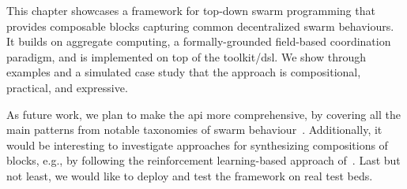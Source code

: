 This chapter showcases
 a framework 
 for top-down swarm programming
 that provides composable blocks 
 capturing common decentralized swarm behaviours.
%
It builds on aggregate computing,
 a formally-grounded field-based coordination paradigm,
 and is implemented on top of the \scafi{} toolkit/\ac{dsl}.
%
We show through examples and a simulated case study
 that the approach is compositional, practical, and expressive.

As future work,
 we plan to make the \ac{api} more comprehensive,
 by covering all the main patterns from notable taxonomies of swarm behaviour~\cite{DBLP:journals/swarm/BrambillaFBD13}.
%
Additionally, it would be interesting to investigate approaches for synthesizing compositions of \MacroSwarm{} blocks, e.g., by following the reinforcement learning-based approach of~\cite{DBLP:conf/coordination/AguzziCV22}.
%
Last but not least, we would like to deploy and test the framework on real test beds.

